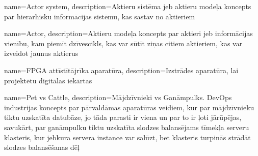 {
    name=Actor system,
    description={Aktieru sistēma jeb aktieru modeļa koncepts par hierarhisku informācijas sistēmu, kas sastāv no aktieriem}
}

{
    name=Actor,
    description={Aktieru modeļa koncepts par aktieri jeb informācijas vienību, kam piemīt dzīvescikls, 
        kas var sūtīt ziņas citiem aktieriem, kas var izveidot jaunus aktierus}
}

{
    name=FPGA attīstītājrīka aparatūra,
    description={Izstrādes aparatūra, lai projektētu digitālas iekārtas}
}

{
    name=Pet vs Cattle,
    description={Mājdzīvnieki vs Ganāmpulks. DevOps industrijas koncepts par pārvaldāmas aparatūras veidiem, kur
        par mājdzīvnieku tiktu uzskatīta datubāze, jo tāda parasti ir viena un par to ir ļoti jārūpējas, savukārt,
        par ganāmpulku tiktu uzskatīta slodzes balansējams tīmekļa serveru klasteris, kur jebkura servera instance
        var salūzt, bet klasteris turpinās strādāt slodzes balansēšanas dēļ}
}